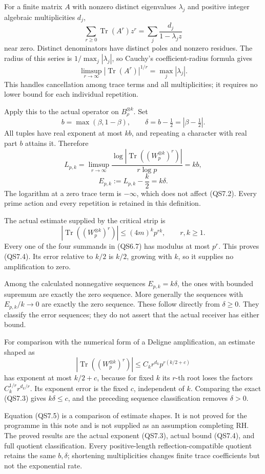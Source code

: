 For a finite matrix \(A\) with nonzero distinct eigenvalues
\(\lambda_j\) and positive integer algebraic multiplicities \(d_j\), \[
\sum_{r\ge0}\operatorname{Tr}(A^r)z^r
=\sum_j\frac{d_j}{1-\lambda_jz}
\tag{QS7.1}
\] near zero. Distinct denominators have distinct poles and nonzero
residues. The radius of this series is \(1/\max_j|\lambda_j|\), so
Cauchy's coefficient-radius formula gives \[
\limsup_{r\to\infty}|\operatorname{Tr}(A^r)|^{1/r}
=\max_j|\lambda_j|.
\tag{QS7.2}
\] This handles cancellation among trace terms and all multiplicities;
it requires no lower bound for each individual repetition.

Apply this to the actual operator on \(B_\rho^{\otimes k}\). Set \[
b=\max(\beta,1-\beta),\qquad
\delta=b-\tfrac12=|\beta-\tfrac12|.
\] All tuples have real exponent at most \(kb\), and repeating a
character with real part \(b\) attains it. Therefore \[
L_{p,k}
=\limsup_{r\to\infty}
\frac{\log|\operatorname{Tr}((W_p^{\otimes k})^r)|}{r\log p}
=kb,
\] \[
\boxed{E_{p,k}:=L_{p,k}-\frac{k}{2}=k\delta.}
\tag{QS7.3}
\] The logarithm at a zero trace term is \(-\infty\), which does not
affect (QS7.2). Every prime action and every repetition is retained in
this definition.

The actual estimate supplied by the critical strip is \[
|\operatorname{Tr}((W_p^{\otimes k})^r)|
\le(4m)^kp^{rk},\qquad r,k\ge1.
\tag{QS7.4}
\] Every one of the four summands in (QS6.7) has modulus at most
\(p^r\). This proves (QS7.4). Its error relative to \(k/2\) is \(k/2\),
growing with \(k\), so it supplies no amplification to zero.

Among the calculated nonnegative sequences \(E_{p,k}=k\delta\), the ones
with bounded supremum are exactly the zero sequence. More generally the
sequences with \(E_{p,k}/k\to0\) are exactly the zero sequence. These
follow directly from \(\delta\ge0\). They classify the error sequences;
they do not assert that the actual receiver has either bound.

For comparison with the numerical form of a Deligne amplification, an
estimate shaped as \[
|\operatorname{Tr}((W_p^{\otimes k})^r)|
\le C_k r^{d_k}p^{r(k/2+c)}
\tag{QS7.5}
\] has exponent at most \(k/2+c\), because for fixed \(k\) its \(r\)-th
root loses the factors \(C_k^{1/r}r^{d_k/r}\). Its exponent error is the
fixed \(c\), independent of \(k\). Comparing the exact (QS7.3) gives
\(k\delta\le c\), and the preceding sequence classification removes
\(\delta>0\).

Equation (QS7.5) is a comparison of estimate shapes. It is not proved
for the programme in this note and is not supplied as an assumption
completing RH. The proved results are the actual exponent (QS7.3),
actual bound (QS7.4), and full quotient classification. Every
positive-length reflection-compatible quotient retains the same
\(b,\delta\); shortening multiplicities changes finite trace
coefficients but not the exponential rate.

